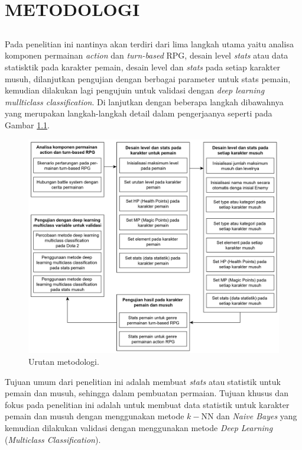 \chapter{METODOLOGI}
\label{chap:chap3_metodologi}

\section*{ }
Pada penelitian ini nantinya akan terdiri dari lima langkah utama yaitu analisa komponen permainan \textit{action} dan \textit{turn-based} RPG, desain level \textit{stats} atau data statisktik pada karakter pemain, desain level dan \textit{stats} pada setiap karakter musuh, dilanjutkan pengujian dengan berbagai parameter untuk stats pemain, kemudian dilakukan lagi pengujuin untuk validasi dengan \textit{deep learning mullticlass classification}. Di lanjutkan dengan beberapa langkah dibawahnya yang merupakan langkah-langkah detail dalam pengerjaanya seperti pada Gambar \ref{fig:metodologi_2}.

\begin{figure} [!h] \centering
	\includegraphics[scale=0.17]{img/metodologi_new.png}
	\caption{Urutan metodologi.}
	\label{fig:metodologi_2}    
\end{figure}

Tujuan umum dari penelitian ini adalah membuat \textit{stats} atau statistik untuk pemain dan musuh, sehingga dalam pembuatan permaian. Tujuan khusus dan fokus pada penelitian ini adalah untuk membuat data statistik untuk karakter pemain dan musuh dengan menggunakan metode $k-$NN dan \textit{Naive Bayes} yang kemudian dilakukan validasi dengan menggunakan metode \textit{Deep Learning} (\textit{Multiclass Classification}).
\vspace{1ex}

